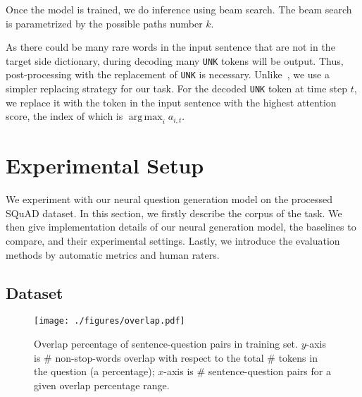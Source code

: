 \documentclass[11pt,a4paper]{article}
\DeclareMathOperator*{\argmax}{arg\,max} %
\begin{document}

Once the model is trained, we do inference using beam search. The beam search is parametrized by the possible paths number $k$. 

As there could be many rare words in the input sentence that are not in the target side dictionary, during decoding many \verb|UNK| tokens will be output. Thus, post-processing with the replacement of \verb|UNK| is necessary. Unlike~, we use a simpler replacing strategy for our task. For the decoded \verb|UNK| token at time step $t$, we replace it with the token in the input sentence with the highest attention score, the index of which is $\argmax_{i} a_{i,t}$.


\section{Experimental Setup}
\label{sec:experiment}

We experiment with our neural question generation model on the processed SQuAD dataset. In this section, we firstly describe the corpus of the task. We then give implementation details of our neural generation model, the baselines to compare, and their experimental settings. Lastly, we introduce the evaluation methods by automatic metrics and human raters.

\subsection{Dataset} 
\label{ssec:dataset}

\begin{figure}[t]
\centering
\texttt{[image: ./figures/overlap.pdf]}
\vspace{-0.4cm}
\caption{Overlap percentage of sentence-question pairs in training set. $y$-axis is \# non-stop-words overlap with respect to the total \# tokens in the question (a percentage); $x$-axis is \# sentence-question pairs for a given overlap percentage range.}
\vspace{-0.4cm}
\label{fig:overlap}
\end{figure}
\end{document}
